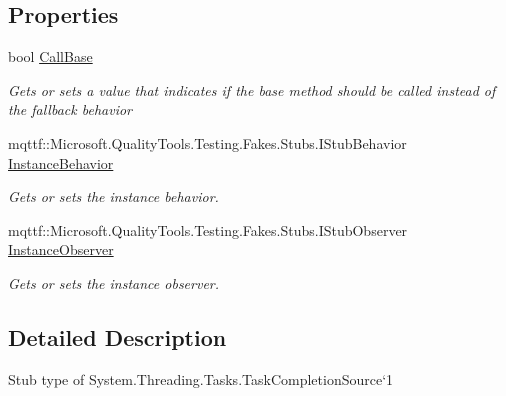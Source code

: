 \subsection*{Properties}
\begin{DoxyCompactItemize}
\item 
bool \hyperlink{class_system_1_1_threading_1_1_tasks_1_1_fakes_1_1_stub_task_completion_source_3_01_t_result_01_4_a74bafdb6e966b6c72587eb8f2824827f}{Call\-Base}
\begin{DoxyCompactList}\small\item\em Gets or sets a value that indicates if the base method should be called instead of the fallback behavior\end{DoxyCompactList}\item 
mqttf\-::\-Microsoft.\-Quality\-Tools.\-Testing.\-Fakes.\-Stubs.\-I\-Stub\-Behavior \hyperlink{class_system_1_1_threading_1_1_tasks_1_1_fakes_1_1_stub_task_completion_source_3_01_t_result_01_4_adf60291598e754e51cb28dae099b1fbb}{Instance\-Behavior}
\begin{DoxyCompactList}\small\item\em Gets or sets the instance behavior.\end{DoxyCompactList}\item 
mqttf\-::\-Microsoft.\-Quality\-Tools.\-Testing.\-Fakes.\-Stubs.\-I\-Stub\-Observer \hyperlink{class_system_1_1_threading_1_1_tasks_1_1_fakes_1_1_stub_task_completion_source_3_01_t_result_01_4_a3e0ef033d985503e726425da82cca551}{Instance\-Observer}
\begin{DoxyCompactList}\small\item\em Gets or sets the instance observer.\end{DoxyCompactList}\end{DoxyCompactItemize}


\subsection{Detailed Description}
Stub type of System.\-Threading.\-Tasks.\-Task\-Completion\-Source`1



